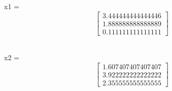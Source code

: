 

x1 = 
\[\begin{bmatrix}
	3.444444444444446 \\ 
	1.888888888888889 \\
	0.111111111111111 
	\end{bmatrix}\]
	\
	
	x2 = 
	\[\begin{bmatrix}
		1.607407407407407 \\ 
		3.922222222222222 \\
		2.355555555555555 
		\end{bmatrix}\]
